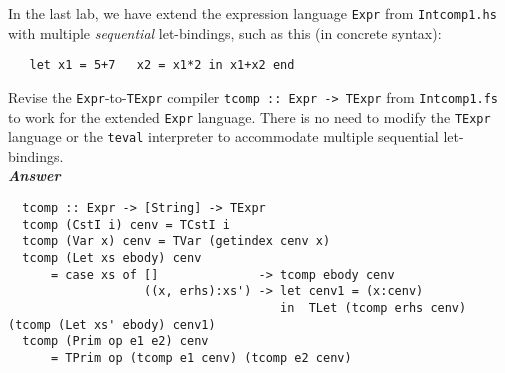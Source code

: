\documentclass[a4paper]{article}
\begin{document}
\begin{exercise}\label{exer-multi-let-tcomp}
In the last lab, we have extend the expression language \texttt{Expr} from \texttt{Intcomp1.hs}
  with multiple \emph{sequential} let-bindings, such as this (in
  concrete syntax):

{\codesetup\begin{verbatim}
   let x1 = 5+7   x2 = x1*2 in x1+x2 end
\end{verbatim}}


  Revise the \texttt{Expr}-to-\texttt{TExpr} compiler \texttt{tcomp ::\ 
    Expr -> TExpr} from \texttt{Intcomp1.fs} to work for the extended
  \texttt{Expr} language.
  There is no need to modify the \texttt{TExpr} language or the
  \texttt{teval} interpreter to accommodate multiple sequential
  let-bindings.\\
  
  \noindent
\textbf{\emph{Answer}}
{\codesetup\begin{verbatim}
  tcomp :: Expr -> [String] -> TExpr 
  tcomp (CstI i) cenv = TCstI i
  tcomp (Var x) cenv = TVar (getindex cenv x)
  tcomp (Let xs ebody) cenv
      = case xs of []              -> tcomp ebody cenv 
                   ((x, erhs):xs') -> let cenv1 = (x:cenv)
                                      in  TLet (tcomp erhs cenv) (tcomp (Let xs' ebody) cenv1)
  tcomp (Prim op e1 e2) cenv
      = TPrim op (tcomp e1 cenv) (tcomp e2 cenv)
\end{verbatim}}
\end{exercise}
\end{document}
